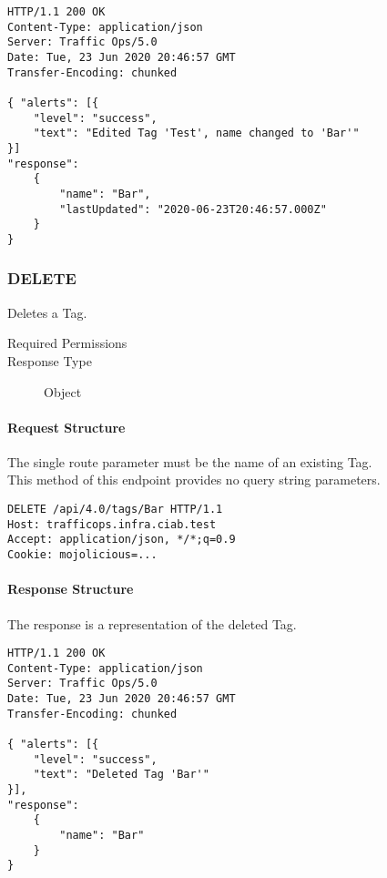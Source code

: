 \begin{codelisting}
\begin{verbatim}
HTTP/1.1 200 OK
Content-Type: application/json
Server: Traffic Ops/5.0
Date: Tue, 23 Jun 2020 20:46:57 GMT
Transfer-Encoding: chunked

{ "alerts": [{
	"level": "success",
	"text": "Edited Tag 'Test', name changed to 'Bar'"
}]
"response":
	{
		"name": "Bar",
		"lastUpdated": "2020-06-23T20:46:57.000Z"
	}
}
\end{verbatim}
\end{codelisting}

\subsubsection{DELETE}
Deletes a Tag.
\begin{description}
	\item[Required Permissions] 
	\item[Response Type] Object
\end{description}

\paragraph{Request Structure}
The single route parameter  must be the name of an existing
Tag.\\
This method of this endpoint provides no query string parameters.

\begin{codelisting}
\begin{verbatim}
DELETE /api/4.0/tags/Bar HTTP/1.1
Host: trafficops.infra.ciab.test
Accept: application/json, */*;q=0.9
Cookie: mojolicious=...

\end{verbatim}
\end{codelisting}

\paragraph{Response Structure}
The response is a representation of the deleted Tag.

\begin{codelisting}
\begin{verbatim}
HTTP/1.1 200 OK
Content-Type: application/json
Server: Traffic Ops/5.0
Date: Tue, 23 Jun 2020 20:46:57 GMT
Transfer-Encoding: chunked

{ "alerts": [{
	"level": "success",
	"text": "Deleted Tag 'Bar'"
}],
"response":
	{
		"name": "Bar"
	}
}
\end{verbatim}
\end{codelisting}
